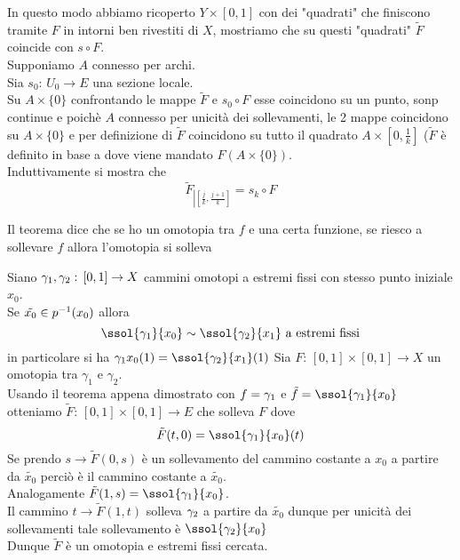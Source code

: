 \begin{thm}
In questo modo abbiamo ricoperto $Y \times [0,1]$ con dei "quadrati" che finiscono tramite $F$ in intorni ben rivestiti di $X$, mostriamo che su questi "quadrati" $\tilde{F}$ coincide con $s\circ F$.\\
Supponiamo $A$ connesso per archi.\\
Sia $s_0:\, U_0 \to E$ una sezione locale.\\
Su $A\times\{0\}$ confrontando le mappe $\tilde{F}$ e $s_0\circ F$ esse coincidono su un punto, sonp continue e poich\`e $A$ connesso per unicit\`a dei sollevamenti, le 2 mappe coincidono su $A\times\{0\}$ e per definizione di $\tilde{F}$ coincidono su tutto il quadrato $A\times\left[ 0, \frac{1}{k} \right]$ ($\tilde{F}$ \`e definito in base a  dove viene mandato $F(A\times\{0\})$.\\
Induttivamente si mostra che 
$$ \tilde{F}_{\left\vert \left[ \frac{j}{k},\frac{j+1}{k} \right] \right.} = s_k \circ F $$
\end{thm}
\begin{oss}Il teorema dice che se ho un omotopia tra $f$ e una certa funzione, se riesco a sollevare $f$ allora l'omotopia si solleva
\end{oss}
\begin{cor}Siano $\gamma_1, \gamma_2:\, [0,1]\to X$ cammini omotopi a estremi fissi con stesso punto iniziale $x_0$.\\
Se $\tilde{x_0}\in p^{-1}(x_0)$ allora 
$$ \ssol{\amma_1}{x_0} \sim \ssol{\amma_2}{x_1} \text{ a estremi fissi}$$
in particolare si ha ${\amma_1}{x_0}(1)= \ssol{\amma_2}{x_1}(1)$
\proof Sia $F:\, [0,1]\times [0,1] \to X$ un omotopia tra $\gamma_1$ e $\gamma_2$.\\
Usando il teorema appena dimostrato con $f=\gamma_1$ e $\tilde{f}=\ssol{\amma_1}{x_0}$ otteniamo $\tilde{F}:\, [0,1]\times[0,1]\to E$ che solleva $F$ dove 
$$ \tilde{F}(t,0)=\ssol{\gamma_1}{x_0}(t)$$
Se prendo $s\to \tilde{F}(0,s)$  \`e un sollevamento del cammino costante a $x_0$ a partire da $\tilde{x_0}$ perci\`o \`e il cammino costante a $\tilde{x_0}$.\\
Analogamente $\tilde{F}(1,s)= \ssol{\amma_1}{x_0}$.\\
Il cammino $t \to \tilde{F}(1,t)$ solleva $\gamma_2$ a partire da $\tilde{x_0}$ dunque per unicit\`a dei sollevamenti tale sollevamento \`e $\ssol{\amma_2}{x_0}$\\
Dunque $\tilde{F}$ \`e un omotopia e estremi fissi cercata.\\

\end{cor}
